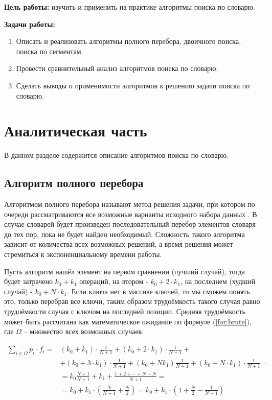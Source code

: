 \documentclass[12pt]{report}
\begin{document}
\textbf{Цель работы:} изучить и применить на практике алгоритмы поиска по словарю.\vspace{\baselineskip} 

\textbf{Задачи работы:}
\begin{enumerate}	
	\item Описать и реализовать алгоритмы полного перебора, двоичного поиска, поиска по сегментам.
	
	\item Провести сравнительный анализ алгоритмов поиска по словарю.
	
	\item Сделать выводы о применимости алгоритмов к решению задачи поиска по словарю.
\end{enumerate}


\chapter{Аналитическая часть}
В данном разделе содержится описание алгоритмов поиска по словарю.

\section{Алгоритм полного перебора}
Алгоритмом полного перебора называют метод решения задачи, при
котором по очереди рассматриваются все возможные варианты исходного
набора данных \cite{brute}. В случае словарей будет произведен последовательный перебор элементов словаря до тех пор, пока не будет найден необходимый.
Сложность такого алгоритма зависит от количества всех возможных решений, а время решения может стремиться к экспоненциальному времени
работы.

Пусть алгоритм нашёл элемент на первом сравнении (лучший случай), тогда будет затрачено $k_0 + k_1$ операций, на втором - $k_0 + 2 \cdot k_1$, на последнем (худший случай) - $k_0 + N \cdot k_1$. Если ключа нет в массиве ключей, то мы сможем понять это, только перебрав все ключи, таким образом трудоёмкость такого случая равно трудоёмкости случая с ключом на последней позиции. Средняя трудоёмкость может быть рассчитана как математическое ожидание по формуле (\ref{for:brute}), где $\Omega$ -- множество всех возможных случаев.

\begin{equation}
	\label{for:brute}
	\begin{aligned}
		\sum\limits_{i \in \Omega} p_i \cdot f_i = & (k_0 + k_1) \cdot \frac{1}{N + 1} + (k_0 + 2 \cdot k_1) \cdot \frac{1}{N+1} +\\
		& + (k_0 + 3 \cdot k_1) \cdot \frac{1}{N + 1} + (k_0 + Nk_1)\frac{1}{N + 1} + (k_0 + N \cdot k_1) \cdot \frac{1}{N + 1} =\\
		& = k_0\frac{N+1}{N+1}+k_1+\frac{1 + 2 + \cdots + N + N}{N + 1} = \\
		& = k_0 + k_1 \cdot \left(\frac{N}{N + 1} + \frac{N}{2}\right) = k_0 + k_1 \cdot \left(1 + \frac{N}{2} - \frac{1}{N + 1}\right)
	\end{aligned}
\end{equation}
\end{document}
